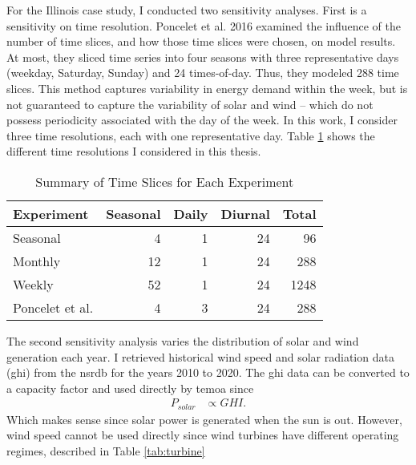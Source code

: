 For the Illinois case study, I conducted two sensitivity analyses. First is a
sensitivity on time resolution. Poncelet et al. 2016 examined the influence of
the number of time slices, and how those time slices were chosen, on model results.
At most, they sliced time series into four seasons with three representative days (weekday,
Saturday, Sunday) and 24 times-of-day. Thus, they modeled 288 time slices. This
method captures variability in energy demand within the week, but is not guaranteed
to capture the variability of solar and wind -- which do not possess periodicity
associated with the day of the week. In this work, I consider three time resolutions,
each with one representative day. Table \ref{tab:time-slice} shows the different
time resolutions I considered in this thesis.

\begin{table}[H]
  \centering
  \caption{Summary of Time Slices for Each Experiment}
  \label{tab:time-slice}
  \begin{tabular}{lrrrr}
    \toprule
    Experiment & Seasonal & Daily & Diurnal & Total\\
    \midrule
    Seasonal & 4 & 1 & 24 & 96\\
    Monthly & 12 & 1 & 24 & 288\\
    Weekly & 52 & 1 & 24 & 1248\\
    \midrule
    Poncelet et al. \cite{poncelet_impact_2016} & 4 & 3 &  24 & 288\\
    \bottomrule
  \end{tabular}
\end{table}

The second sensitivity analysis varies the distribution of solar and wind generation
each year. I retrieved historical wind speed and solar radiation data (\gls{ghi})
from the \gls{nsrdb} \cite{sengupta_national_2018} for the years 2010 to 2020.
The \gls{ghi} data can be converted to a capacity factor and used directly by
\gls{temoa} since
\begin{align}
  P_{solar} &\propto GHI.
\end{align}
Which makes sense since solar power is generated when the sun is out. However,
wind speed cannot be used directly since wind turbines have different operating
regimes, described in Table \ref{tab:turbine}

\begin{table}[H]
  \centering
  \caption{Summary of Wind Turbine Data}
  \label{tab:turbine}

\end{table}

